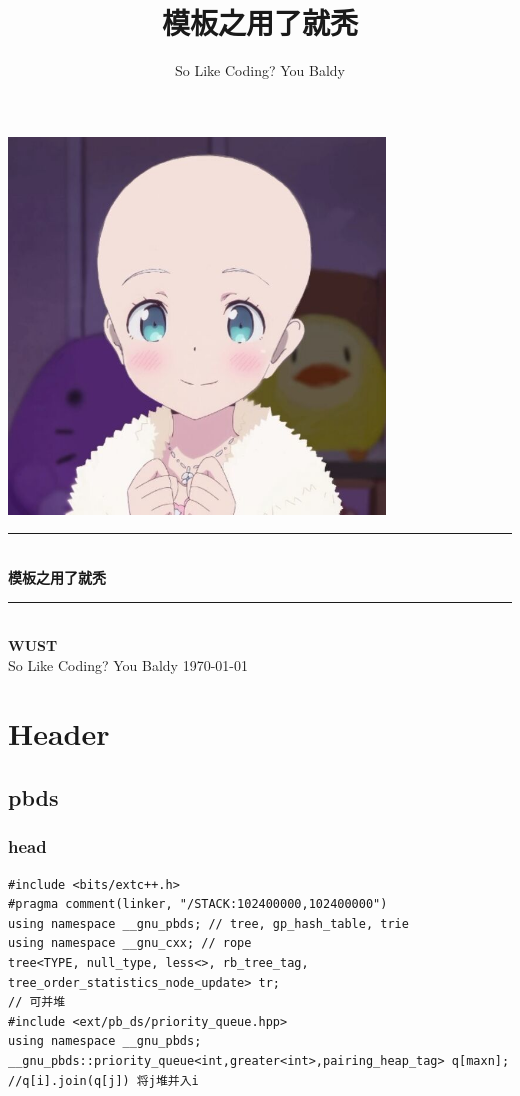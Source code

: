 \documentclass[twoside]{article}
\title{模板之用了就秃}
\author{So Like Coding? You Baldy}
\newcommand{\HRule}{\rule{\linewidth}{0.5mm}}
\begin{document}
\small
\begin{titlepage}
\begin{center}
\includegraphics[width=0.75\textwidth]{logo.jpg} \\ [2cm]
\HRule \\ [1cm]
\textbf{\Huge{模板之用了就秃}} \\ [0.5cm]
\HRule \\ [2cm]
\textbf{\Huge{WUST}} \\ [1cm]
\LARGE{So Like Coding? You Baldy}
\vfill
\Large{\today}
\end{center}
\clearpage
\end{titlepage}
\tableofcontents\clearpage
\pagestyle{fancy}
\lfoot{}
\cfoot{\thepage}\rfoot{}
\setcounter{section}{-1}
\setcounter{page}{1}
\clearpage\section{Header}
\subsection{pbds}
\subsubsection{head}
\begin{lstlisting}
#include <bits/extc++.h>
#pragma comment(linker, "/STACK:102400000,102400000")
using namespace __gnu_pbds; // tree, gp_hash_table, trie
using namespace __gnu_cxx; // rope
tree<TYPE, null_type, less<>, rb_tree_tag, tree_order_statistics_node_update> tr;
// 可并堆
#include <ext/pb_ds/priority_queue.hpp>
using namespace __gnu_pbds;
__gnu_pbds::priority_queue<int,greater<int>,pairing_heap_tag> q[maxn];
//q[i].join(q[j]) 将j堆并入i\end{lstlisting}
\end{document}
